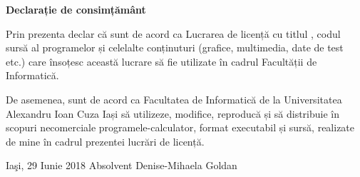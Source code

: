 \hfill \break
\hfill \break

\begin{center}
	\textbf{\large{Declarație de consimțământ}}
\end{center}

\hfill \break
\hfill \break

Prin prezenta declar că sunt de acord ca Lucrarea de licență cu titlul , codul sursă al programelor și celelalte conținuturi  (grafice, multimedia, date de test etc.) care însoțesc această lucrare să fie utilizate în cadrul Facultății de Informatică. 

De asemenea, sunt de acord ca Facultatea de Informatică de la Universitatea Alexandru Ioan Cuza Iași să utilizeze, modifice, reproducă și să distribuie în scopuri necomerciale programele-calculator, format executabil și sursă, realizate de mine în cadrul prezentei lucrări de licență. 

\hfill \break
\hfill \break
\hfill \break
\hfill \break

Iaşi, 29 Iunie 2018 \hfill Absolvent Denise-Mihaela Goldan\\

\clearpage